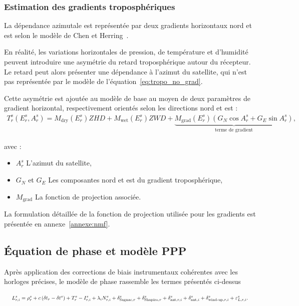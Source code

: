 \subsubsection{Estimation des gradients troposphériques}

La dépendance azimutale est représentée par deux gradients horizontaux nord et
est selon le modèle de Chen et Herring~\cite{chenHerring1997}.

En réalité, les variations horizontales de pression, de température et
d'humidité peuvent introduire une asymétrie du retard troposphérique autour
du récepteur. Le retard peut alors présenter une dépendance à l'azimut du
satellite, qui n'est pas représentée par le modèle
de l'équation~\eqref{eq:tropo_no_grad}.

Cette asymétrie est ajoutée au modèle de base au moyen de deux paramètres de
gradient horizontal, respectivement orientés selon les directions nord et
est :
\begin{align}
T_r^s(E_r^s,A_r^s)
=
M_{\mathrm{dry}}(E_r^s)ZHD
+
M_{\mathrm{wet}}(E_r^s)ZWD
+
\underbrace{
M_{\mathrm{grad}}(E_r^s)
\left(
G_N\cos A_r^s + G_E\sin A_r^s
\right)
}_{\text{terme de gradient}},
\label{eq:tropo_grad}
\end{align}

avec :

\begin{itemize}
    \item $A_r^s$ L'azimut du satellite,
    \item $G_N$ et $G_E$ Les composantes nord et est du gradient
    troposphérique,
    \item $M_{\mathrm{grad}}$ La fonction de projection associée.
\end{itemize}

La formulation détaillée de la fonction de projection utilisée pour les gradients est
présentée en annexe~\ref{annexe:nmf}.

\subsection{Équation de phase et modèle PPP}
\label{ppp:equations}

Après application des corrections de biais instrumentaux cohérentes avec
les horloges précises, le modèle de phase rassemble les termes présentés
ci-dessus~\cite[p.~591]{capderou2012}

\begin{equation}
\resizebox{0.98\textwidth}{!}{$\displaystyle
L_{r,i}^s
=\rho_r^s+c\left(\delta t_r-\delta t^s\right)+T_r^s-I_{r,i}^s
+\lambda_i N_{r,i}^s+\delta_{\mathrm{Sagnac},r}^s
+\delta_{\mathrm{Shapiro},r}^s
+\delta_{\mathrm{ant},r,i}^s+\delta_{\mathrm{ant},i}^s
+\delta_{\mathrm{wind\text{-}up},r,i}^s+\varepsilon_{L,r,i}^s.
$}
\label{new:phase}
\end{equation}

